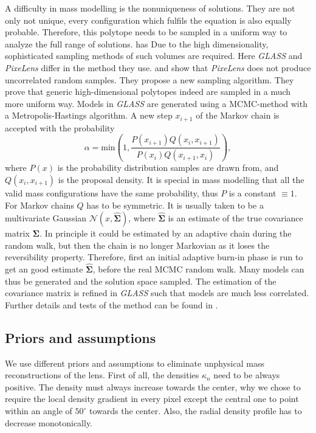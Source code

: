 \documentclass[10pt]{article}
\begin{document}
A difficulty in mass modelling is the nonuniqueness of solutions. They are not only not unique, every configuration which fulfils the equation is also equally probable. Therefore, this polytope needs to be sampled in a uniform way to analyze the full range of solutions. has Due to the high dimensionality, sophisticated sampling methods of such volumes are required. Here \textit{GLASS} and \textit{PixeLens} differ in the method they use. \cite{2008ApJ...679...17C} and \cite{2012MNRAS.425.3077L} show that \textit{PixeLens} does not produce uncorrelated random samples. They propose a new sampling algorithm. They prove that generic high-dimensional polytopes indeed are sampled in a much more uniform way. Models in \textit{GLASS} are generated using a MCMC-method with a Metropolis-Hastings algorithm. A new step $x_{i+1}$ of the Markov chain is accepted with the probability
\begin{equation}
 \alpha = \mathrm{min}\left(1,\frac{P(x_{i+1})Q(x_{i},x_{i+1})}{P(x_{i})Q(x_{i+1},x_{i})}\right),
\end{equation}
where $P(x)$ is the probability distribution samples are drawn from, and $Q(x_{i},x_{i+1})$ is the proposal density. It is special in mass modelling that all the valid mass configurations have the same probability, thus $P$ is a constant $\equiv1$. For Markov chains $Q$ has to be symmetric. It is usually taken to be a multivariate Gaussian $\mathcal{N}(x,\hat{\boldsymbol\Sigma})$, where $\hat{\boldsymbol\Sigma}$ is an estimate of the true covariance matrix $\boldsymbol\Sigma$. In principle it could be estimated by an adaptive chain during the random walk, but then the chain is no longer Markovian as it loses the reversibility property. Therefore, first an initial adaptive burn-in phase is run to get an good estimate $\hat{\boldsymbol\Sigma}$, before the real MCMC random walk. Many models can thus be generated and the solution space sampled. The estimation of the covariance matrix is refined in \textit{GLASS} such that models are much less correlated. Further details and tests of the method can be found in \cite{2012MNRAS.425.3077L}.

\subsection{Priors and assumptions}
We use different priors and assumptions to eliminate unphysical mass reconstructions of the lens. First of all, the densities $\kappa_{n}$ need to be always positive. The density must always increase towards the center, why we chose to require the local density gradient in every pixel except the central one to point within an angle of $50^{\circ}$ towards the center. Also, the radial density profile has to decrease monotonically.
\end{document}
